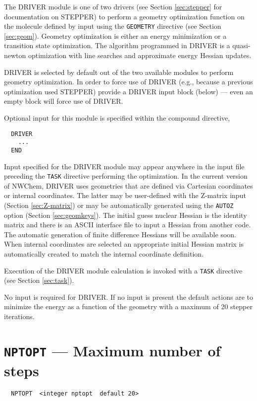 \label{sec:driver}

The DRIVER module is one of two drivers (see Section \ref{sec:stepper}
for documentation on STEPPER) to perform a geometry optimization
function on the molecule defined by input using the \verb+GEOMETRY+
directive (see Section \ref{sec:geom}).  Geometry optimization is
either an energy minimization or a transition state optimization.
The algorithm programmed in DRIVER is a quasi-newton optimization
with line searches and approximate energy Hessian updates.

DRIVER is selected by default out of the two available modules to
perform geometry optimization.  In order to force use of DRIVER (e.g.,
because a previous optimization used STEPPER) provide a DRIVER input
block (below) --- even an empty block will force use of DRIVER.

Optional input for this module is specified within the compound
directive,
\begin{verbatim}
  DRIVER 
    ...
  END
\end{verbatim}

Input specified for the DRIVER module may appear anywhere in the input
file preceding the \verb+TASK+ directive performing the optimization.
In the current version of NWChem, DRIVER uses geometries that are
defined via Cartesian coordinates or internal coordinates. The latter
may be user-defined with the Z-matrix input (Section
\ref{sec:Z-matrix}) or may be automatically generated using the
\verb+AUTOZ+ option (Section \ref{sec:geomkeys}).  The initial guess
nuclear Hessian is the identity matrix and there is an ASCII interface
file to input a Hessian from another code.  The automatic generation
of finite difference Hessians will be available soon. When internal
coordinates are selected an appropriate initial Hessian matrix is
automatically created to match the internal coordinate definition.

Execution of the DRIVER module calculation is invoked with a
\verb+TASK+ directive (see Section \ref{sec:task}).

No input is required for DRIVER.  If no input is present the default
actions are to minimize the energy as a function of the geometry with a
maximum of 20 stepper iterations.

\section{{\tt NPTOPT} --- Maximum number of steps}

\begin{verbatim}
  NPTOPT  <integer nptopt  default 20>
\end{verbatim}

